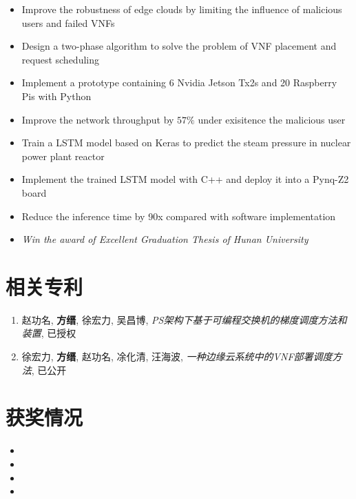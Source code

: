 \documentclass{resume}
\begin{document}
\begin{itemize}
  \item Improve the robustness of edge clouds by limiting the influence of malicious users and failed VNFs
  \item Design a two-phase algorithm to solve the problem of VNF placement and request scheduling
  \item Implement a prototype containing 6 Nvidia Jetson Tx2s and 20 Raspberry Pis with Python
  \item Improve the network throughput by $57\%$ under exisitence the malicious user
\end{itemize}

\begin{itemize}
  \item Train a LSTM model based on Keras to predict the steam pressure in nuclear power plant reactor
  \item Implement the trained LSTM model with C++ and deploy it into a Pynq-Z2 board
  \item Reduce the inference time by 90x compared with software implementation
  \item \textit{Win the award of Excellent Graduation Thesis of Hunan University}
\end{itemize}

\section{相关专利}

\begin{enumerate}
  \item 赵功名, \textbf{方缙}, 徐宏力, 吴昌博, \textit{PS架构下基于可编程交换机的梯度调度方法和装置}, 已授权
  \item 徐宏力, \textbf{方缙}, 赵功名, 凃化清, 汪海波, \textit{一种边缘云系统中的VNF部署调度方法}, 已公开
\end{enumerate}

\section{获奖情况}

\begin{itemize}[parsep=0.5ex]
  \item {}
  \item {}
  \item {}
  \item {}
\end{itemize}
\end{document}
